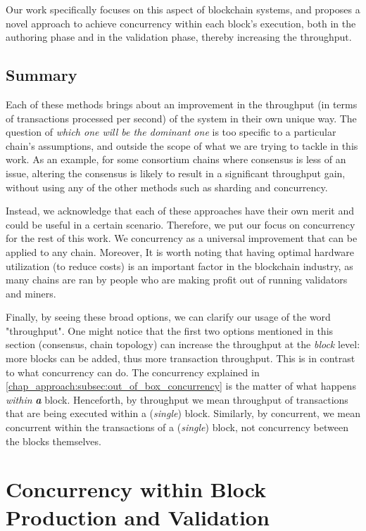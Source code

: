 Our work specifically focuses on this aspect of blockchain systems, and proposes a novel approach
to achieve concurrency within each block's execution, both in the authoring phase and in the
validation phase, thereby increasing the throughput.

\subsection{Summary} \label{chap_bg:subsec:summary_speedup}

Each of these methods brings about an improvement in the throughput (in terms of transactions
processed per second) of the system in their own unique way. The question of \textit{which one will
be the dominant one} is too specific to a particular chain's assumptions, and outside the scope of
what we are trying to tackle in this work. As an example, for some consortium chains where consensus
is less of an issue, altering the consensus is likely to result in a significant throughput gain,
without using any of the other methods such as sharding and concurrency.

Instead, we acknowledge that each of these approaches have their own merit and could be useful in a
certain scenario. Therefore, we put our focus on concurrency for the rest of this work. We
concurrency as a universal improvement that can be applied to any chain. Moreover, It is worth
noting that having optimal hardware utilization (to reduce costs) is an important factor in the
blockchain industry, as many chains are ran by people who are making profit out of running
validators and miners.

Finally, by seeing these broad options, we can clarify our usage of the word "throughput". One might
notice that the first two options mentioned in this section (consensus, chain topology) can increase
the throughput at the \textit{block} level: more blocks can be added, thus more transaction
throughput. This is in contrast to what concurrency can do. The concurrency explained in
\ref{chap_approach:subsec:out_of_box_concurrency} is the matter of what happens \textit{within}
\textit{\textbf{a}} block. Henceforth, by throughput we mean throughput of transactions that are
being executed within a (\textit{single}) block. Similarly, by concurrent, we mean concurrent within
the transactions of a (\textit{single}) block, not concurrency between the blocks themselves.


\section{Concurrency within Block Production and Validation} \label{chap_approach:sec:concurrency}

